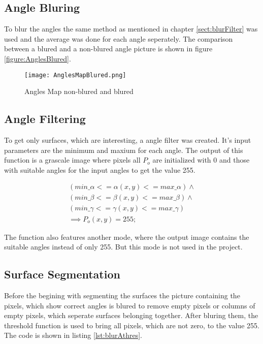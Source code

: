 \subsection{Angle Bluring}

To blur the angles the same method as mentioned in chapter \vref{sect:blurFilter} was used and
the average was done for each angle seperately. The comparison between a blured and a non-blured
angle picture is shown in figure \vref{figure:AnglesBlured}.

\begin{figure}[H]
\begin{center}
  \texttt{[image: AnglesMapBlured.png]}
  \caption{Angles Map non-blured and blured}
  \label{figure:AnglesBlured}
\end{center}
\end{figure}


\subsection{Angle Filtering}

To get only surfaces, which are interesting, a angle filter was created. It's input parameters
are the minimum and maxium for each angle. The output of this function is a grascale image
where pixels all $P_o$ are initialized with 0 and those with suitable angles 
for the input angles to get the value 255.

\begin{gather}
(min\_\alpha  <= \alpha(x,y) <=max\_\alpha ) \wedge \nonumber\\ 
(min\_\beta  <= \beta(x,y) <=max\_\beta )\wedge\nonumber\\
(min\_\gamma  <= \gamma(x,y) <=max\_\gamma )\nonumber\\
\implies P_o(x,y) = 255;
\end{gather}

The function also features another mode, where the output image contains the suitable angles instead of only 255.
But this mode is not used in the project. 

\subsection{Surface Segmentation}

Before the begining with segmenting the surfaces the picture containing the pixels, which show correct angles
is blured to remove empty pixels or columns of empty pixels, which seperate surfaces belonging together. After
bluring them, the threshold function is used to bring all pixels, which are not zero, to the value 255. 
The code is shown in listing \vref{lst:blurAthres}.

